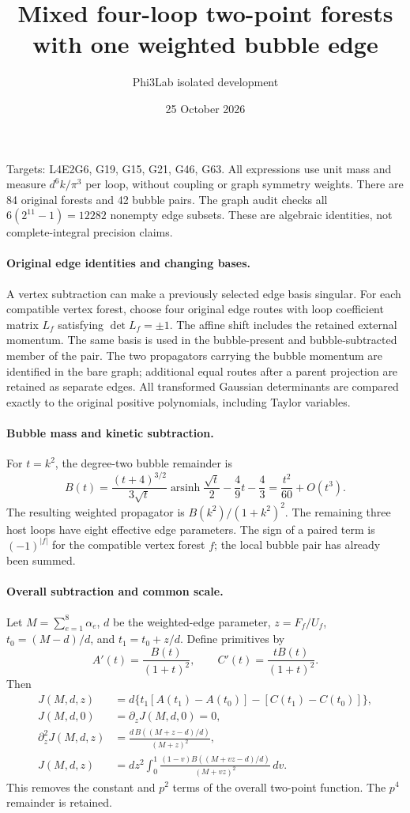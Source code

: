 \documentclass[11pt]{article}
\title{Mixed four-loop two-point forests\\with one weighted bubble edge}
\author{Phi3Lab isolated development}
\date{25 October 2026}
\begin{document}
\maketitle
\noindent Targets: L4E2G6, G19, G15, G21, G46, G63. All expressions use
unit mass and measure $d^6k/\pi^3$ per loop, without coupling or graph
symmetry weights. There are 84 original forests and 42 bubble pairs.
The graph audit checks all $6(2^{11}-1)=12282$ nonempty edge subsets.
These are algebraic identities, not complete-integral precision claims.

\paragraph{Original edge identities and changing bases.}
A vertex subtraction can make a previously selected edge basis singular.
For each compatible vertex forest, choose four original edge routes with
loop coefficient matrix $L_f$ satisfying $\det L_f=\pm1$.
The affine shift includes the retained external momentum. The same basis
is used in the bubble-present and bubble-subtracted member of the pair.
The two propagators carrying the bubble momentum are identified in the
bare graph; additional equal routes after a parent projection are retained
as separate edges. All transformed Gaussian determinants are compared
exactly to the original positive polynomials, including Taylor variables.

\paragraph{Bubble mass and kinetic subtraction.}
For $t=k^2$, the degree-two bubble remainder is
\[
 B(t)=\frac{(t+4)^{3/2}}{3\sqrt t}\operatorname{arsinh}\frac{\sqrt t}{2}
       -\frac49t-\frac43
     =\frac{t^2}{60}+O(t^3).
\]
The resulting weighted propagator is $B(k^2)/(1+k^2)^2$.
The remaining three host loops have eight effective edge parameters.
The sign of a paired term is $(-1)^{|f|}$ for the compatible vertex
forest $f$; the local bubble pair has already been summed.

\paragraph{Overall subtraction and common scale.}
Let $M=\sum_{e=1}^8\alpha_e$, $d$ be the weighted-edge parameter,
$z=F_f/U_f$, $t_0=(M-d)/d$, and $t_1=t_0+z/d$.
Define primitives by
\[
 A'(t)=\frac{B(t)}{(1+t)^2},\qquad
 C'(t)=\frac{tB(t)}{(1+t)^2}.
\]
Then
\begin{align*}
 J(M,d,z)&=d\{t_1[A(t_1)-A(t_0)]-[C(t_1)-C(t_0)]\},\\
 J(M,d,0)&=\partial_zJ(M,d,0)=0,\\
 \partial_z^2J(M,d,z)
 &=\frac{d\,B((M+z-d)/d)}{(M+z)^2},\\
 J(M,d,z)&=d z^2\int_0^1
 \frac{(1-v)B((M+vz-d)/d)}{(M+vz)^2}\,dv .
\end{align*}
This removes the constant and $p^2$ terms of the overall two-point
function. The $p^4$ remainder is retained.
\end{document}
